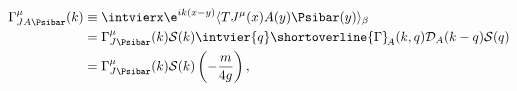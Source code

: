 \begin{equation}
\begin{split}
  \Gamma_{JA\smash[t]{\Psibar}}^\mu(k)&\equiv \intvierx
  \e^{ik(x-y)}\langle T J^\mu(x)A(y)\Psibar(y)\rangle_\beta\nonumber\\
  &=\Gamma_{J\smash[t]{\Psibar}}^\mu(k)\mathcal{S}(k) \intvier{q}
  \shortoverline{\Gamma}_{\!A}(k,q)\mathcal{D}_A(k-q)\mathcal{S}(q)
  \nonumber\\
  &=\Gamma_{J\smash[t]{\Psibar}}^\mu(k)\mathcal{S}(k)
  \left(-\frac{m}{4g}\right),
\end{split}
\end{equation}

